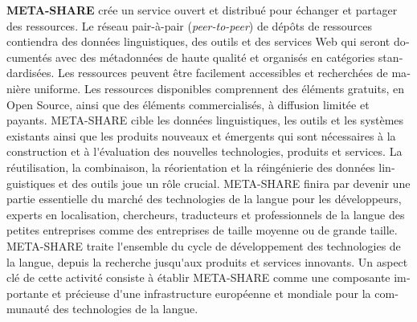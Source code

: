 \begin{french}
\begin{multicols}{2}
\textbf{META-SHARE} crée un service ouvert et distribué pour échanger et partager des ressources. Le réseau pair-à-pair ({\it peer-to-peer}) de dépôts de ressources contiendra des données linguistiques, des outils et des services Web qui seront documentés avec des métadonnées de haute qualité et organisés en catégories standardisées. Les ressources peuvent être facilement accessibles et recherchées de manière uniforme. Les ressources disponibles comprennent des éléments gratuits, en Open Source, ainsi que des éléments commercialisés, à diffusion limitée et payants. META-SHARE cible les données linguistiques, les outils et les systèmes existants ainsi que les produits nouveaux et émergents qui sont nécessaires à la construction et à l{\mbox '}évaluation des nouvelles technologies, produits et services. La réutilisation, la combinaison, la réorientation et la réingénierie des données linguistiques et des outils joue un rôle crucial. META-SHARE finira par devenir une partie essentielle du marché des technologies de la langue pour les développeurs, experts en localisation, chercheurs, traducteurs et professionnels de la langue des petites entreprises comme des entreprises de taille moyenne ou de grande taille. META-SHARE traite l{\mbox '}ensemble du cycle de développement des technologies de la langue, depuis la recherche jusqu{\mbox '}aux produits et services innovants. Un aspect clé de cette activité consiste à établir META-SHARE comme une composante importante et précieuse d{\mbox '}une infrastructure européenne et mondiale pour la communauté des technologies de la langue.


\end{multicols}
\end{french}
